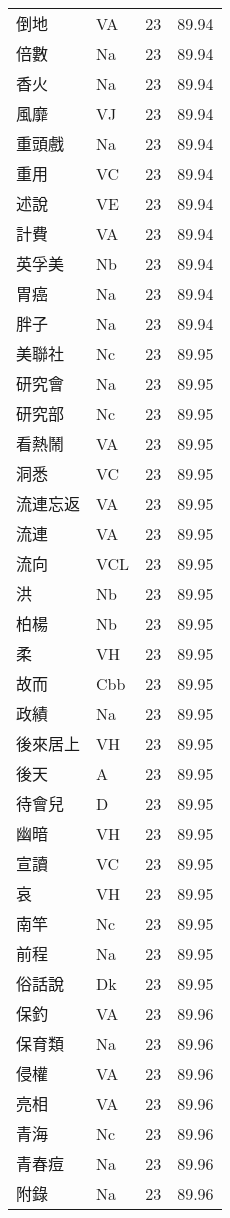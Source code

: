 \documentclass[twocolumn]{book}
\begin{document}
\begin{supertabular}{llrr}
倒地 & VA & 23 &  89.94\\
倍數 & Na & 23 &  89.94\\
香火 & Na & 23 &  89.94\\
風靡 & VJ & 23 &  89.94\\
重頭戲 & Na & 23 &  89.94\\
重用 & VC & 23 &  89.94\\
述說 & VE & 23 &  89.94\\
計費 & VA & 23 &  89.94\\
英孚美 & Nb & 23 &  89.94\\
胃癌 & Na & 23 &  89.94\\
胖子 & Na & 23 &  89.94\\
美聯社 & Nc & 23 &  89.95\\
研究會 & Na & 23 &  89.95\\
研究部 & Nc & 23 &  89.95\\
看熱鬧 & VA & 23 &  89.95\\
洞悉 & VC & 23 &  89.95\\
流連忘返 & VA & 23 &  89.95\\
流連 & VA & 23 &  89.95\\
流向 & VCL & 23 &  89.95\\
洪 & Nb & 23 &  89.95\\
柏楊 & Nb & 23 &  89.95\\
柔 & VH & 23 &  89.95\\
故而 & Cbb & 23 &  89.95\\
政績 & Na & 23 &  89.95\\
後來居上 & VH & 23 &  89.95\\
後天 & A & 23 &  89.95\\
待會兒 & D & 23 &  89.95\\
幽暗 & VH & 23 &  89.95\\
宣讀 & VC & 23 &  89.95\\
哀 & VH & 23 &  89.95\\
南竿 & Nc & 23 &  89.95\\
前程 & Na & 23 &  89.95\\
俗話說 & Dk & 23 &  89.95\\
保釣 & VA & 23 &  89.96\\
保育類 & Na & 23 &  89.96\\
侵權 & VA & 23 &  89.96\\
亮相 & VA & 23 &  89.96\\
青海 & Nc & 23 &  89.96\\
青春痘 & Na & 23 &  89.96\\
附錄 & Na & 23 &  89.96\\

\end{supertabular}
\end{document}
